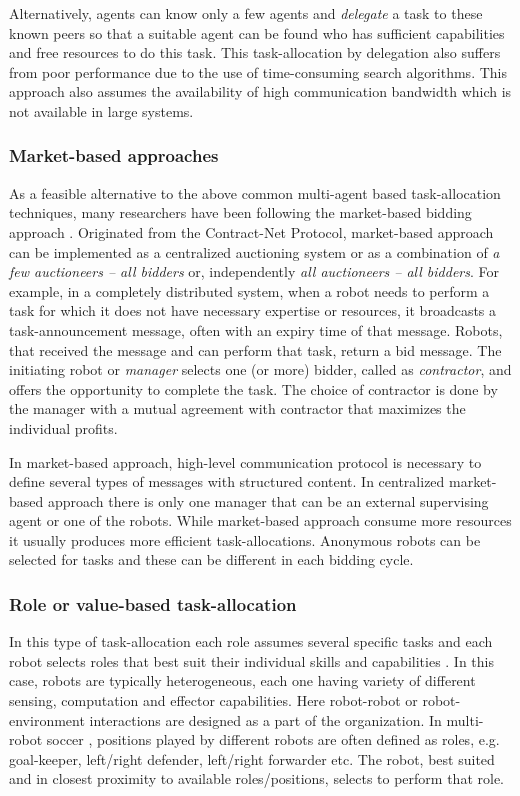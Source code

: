 Alternatively, agents can know only a few agents and {\em delegate} a task to these known peers so that a suitable agent can be found who has sufficient capabilities and free resources to do this task. This task-allocation by delegation also suffers from poor performance  due to the use of time-consuming search algorithms. This approach also assumes the availability of high communication bandwidth which is not available in large systems. 
\subsubsection*{Market-based approaches}
As a feasible alternative to the above common multi-agent based task-allocation techniques, many researchers have been following the market-based bidding approach . Originated from the Contract-Net Protocol, market-based approach can be implemented as a centralized auctioning system or as a combination of {\em a few auctioneers -- all bidders} or, independently {\em all auctioneers -- all bidders}. For example, in a completely distributed system, when a robot needs to perform a task for which it does not have necessary expertise or resources, it broadcasts a task-announcement message, often with  an expiry time of that message. Robots, that received the message and can perform that task, return a bid message. The initiating robot or {\em  manager} selects one (or more) bidder, called as {\em contractor}, and offers the opportunity to complete the task. The choice of contractor is done by the manager with a mutual agreement with contractor that maximizes the individual profits. 

In market-based approach, high-level communication protocol is necessary to define several types of messages with structured content. In centralized market-based approach there is only one manager that can be an external supervising agent or  one of the robots. While market-based approach consume more resources it usually produces more efficient task-allocations. Anonymous robots can be selected for tasks and these can be different in each bidding cycle.
%
\subsubsection*{Role or value-based task-allocation}
In this type of task-allocation each role assumes several specific tasks and each robot selects roles that best suit their individual skills and capabilities \cite{Chaimowicz2002}. In this case, robots are typically heterogeneous, each one having variety of different sensing, computation and effector capabilities. Here robot-robot or robot-environment interactions are designed as a part of the organization. In multi-robot soccer \cite{Stone+1999}, positions played by different  robots are often defined as roles, e.g. goal-keeper, left/right defender, left/right forwarder etc. The robot, best suited and in closest proximity to available roles/positions, selects to perform that role.
